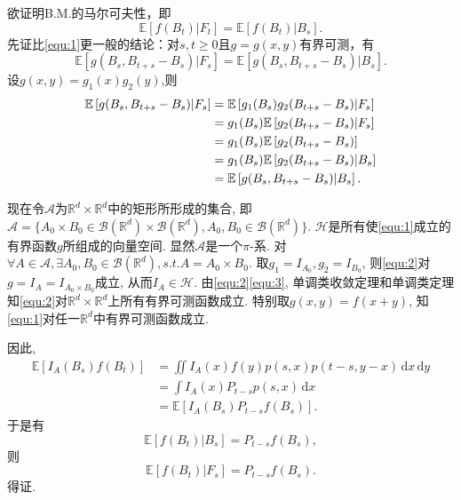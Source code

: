 \documentclass{article}
\makeatletter
\renewenvironment{proof}[1][\proofname]{\par
  \pushQED{\qed}%
  \normalfont \topsep6\p@\@plus6\p@\relax
  \trivlist
  \item[\hskip\labelsep
        \bfseries\itshape
    #1\@addpunct{.}]\ignorespaces
}{%
  \popQED\endtrivlist\@endpefalse
}
\newcommand{\RR}[0]{\mathbb{R}}
\newcommand{\dd}[1]{\,\mathrm{d}#1}
\newcommand{\E}[1]{\mathbb{E}\left[#1\right]}
\makeatother
\begin{document}
\begin{proof}
  欲证明B.M.的马尔可夫性，即
    	\begin{equation}
    		\label{equ:1}
    		\E{f(B_t)|F_t} = \E{f(B_t)|B_s}.
    	\end{equation}
    	先证比\eqref{equ:1}更一般的结论：对$s,t\geq 0$且$g=g(x,y)$有界可测，有
    	\begin{equation}
    		\label{equ:2}
    		\E{g(B_s,B_{t+s}-B_s)|F_s} = \E{g(B_s,B_{t+s}-B_s)|B_s}.
    	\end{equation}
    	设$g(x,y)=g_1(x)g_2(y)$,则
    	\begin{align}
    		\E{g(B_s,B_{t+s}-B_s)|F_s} & = \E{g_1(B_s)g_2(B_{t+s}-B_s)|F_s}\notag\\
    		& = g_1(B_s)\E{g_2(B_{t+s}-B_s)|F_s}\notag\\
    		& = g_1(B_s)\E{g_2(B_{t+s}-B_s)}\notag\\
    		& = g_1(B_s)\E{g_2(B_{t+s}-B_s)|B_s}\notag\\
    		\label{equ:3}
    		& = \E{g(B_s,B_{t+s}-B_s)|B_s}.
    	\end{align}
    	
    	现在令$\mathcal{A}$为$\RR^d\times\RR^d$中的矩形所形成的集合, 即$\mathcal{A}=\{A_0\times B_0\in\mathcal{B}(\RR^d)\times\mathcal{B}(\RR^d),A_0,B_0\in\mathcal{B}(\RR^d)\}$. $\mathcal{H}$是所有使\eqref{equ:1}成立的有界函数$g$所组成的向量空间. 显然$\mathcal{A}$是一个$\pi$-系. 对$\forall A\in\mathcal{A}, \exists A_0,B_0\in\mathcal{B}(\RR^d), s.t. A=A_0\times B_0$. 取$g_1=I_{A_0},g_2=I_{B_0}$, 则\eqref{equ:2}对$g=I_A=I_{A_0\times B_0}$成立, 从而$I_A\in\mathcal{H}$. 由\eqref{equ:2}\eqref{equ:3}, 单调类收敛定理和单调类定理知\eqref{equ:2}对$\RR^d\times\RR^d$上所有有界可测函数成立. 特别取$g(x,y)=f(x+y)$, 知\eqref{equ:1}对任一$\RR^d$中有界可测函数成立.
    	
    	因此,
    	\begin{align*}
    		\E{I_A(B_s)f(B_t)} & = \iint I_A(x)f(y)p(s,x)p(t-s,y-x)\dd{x}\dd{y}\\
    		& = \int I_A(x)P_{t-s}p(s,x)\dd{x}\\
    		& = \E{I_A(B_s)P_{t-s}f(B_s)}.
    	\end{align*}
    	于是有
    	\begin{equation*}
    		\E{f(B_t)|B_s} = P_{t-s}f(B_s),
    	\end{equation*}
    	则
    	\begin{equation*}
    		\E{f(B_t)|F_s} = P_{t-s}f(B_s).
    	\end{equation*}
      得证.
\end{proof}
\end{document}
